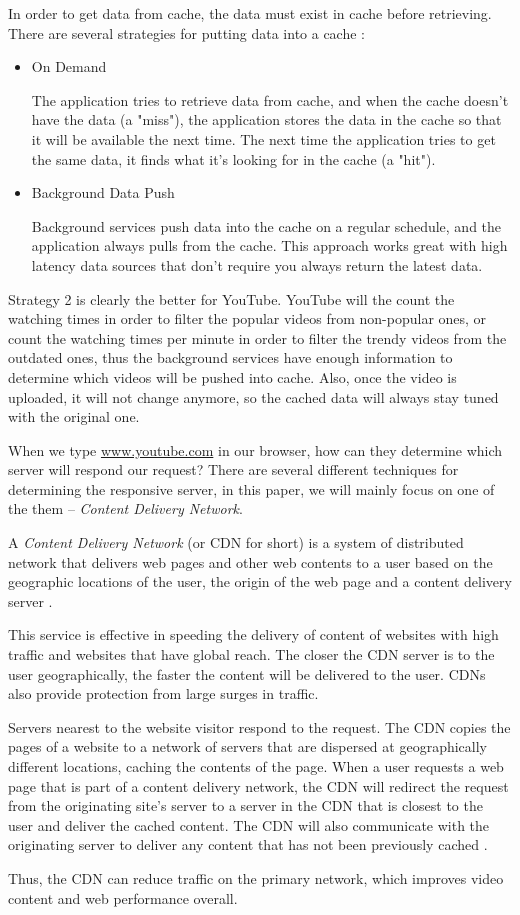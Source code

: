 In order to get data from cache, the data must exist in cache before retrieving. There are several strategies for putting data into a cache \cite{azure:distributed}:
\begin{itemize}
	\item On Demand 

	The application tries to retrieve data from cache, and when the cache doesn't have the data (a "miss"), the application stores the data in the cache so that it will be available the next time. The next time the application tries to get the same data, it finds what it's looking for in the cache (a "hit").

	\item Background Data Push

	Background services push data into the cache on a regular schedule, and the application always pulls from the cache. This approach works great with high latency data sources that don't require you always return the latest data.
\end{itemize}

Strategy 2 is clearly the better for YouTube. YouTube will the count the watching times in order to filter the popular videos from non-popular ones, or count the watching times per minute in order to filter the trendy videos from the outdated ones, thus the background services have enough information to determine which videos will be pushed into cache. Also, once the video is uploaded, it will not change anymore, so the cached data will always stay tuned with the original one.

When we type \url{www.youtube.com} in our browser, how can they determine which server will respond our request? There are several different techniques for determining the responsive server, in this paper, we will mainly focus on one of the them -- \textit{Content Delivery Network}.

A \textit{Content Delivery Network} (or CDN for short) is a system of distributed network that delivers web pages and other web contents to a user based on the geographic locations of the user, the origin of the web page and a content delivery server \cite{webopedia:cdn}.

This service is effective in speeding the delivery of content of websites with high traffic and websites that have global reach. The closer the CDN server is to the user geographically, the faster the content will be delivered to the user. CDNs also provide protection from large surges in traffic.

Servers nearest to the website visitor respond to the request. The CDN copies the pages of a website to a network of servers that are dispersed at geographically different locations, caching the contents of the page. When a user requests a web page that is part of a content delivery network, the CDN will redirect the request from the originating site's server to a server in the CDN that is closest to the user and deliver the cached content. The CDN will also communicate with the originating server to deliver any content that has not been previously cached .

Thus, the CDN can reduce traffic on the primary network, which improves video content and web performance overall.
